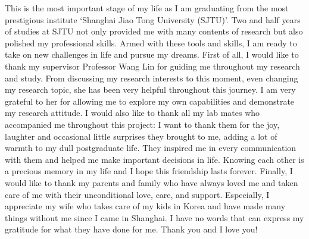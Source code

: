 \begin{thanks}
This is the most important stage of my life as I am graduating from the most prestigious
institute `Shanghai Jiao Tong University (SJTU)'. Two and half years of studies at SJTU not only provided me with many contents of research but also polished my professional skills. Armed with these tools and skills, I am ready to take on new challenges in life and pursue my dreams.
First of all, I would like to thank my supervisor Professor Wang Lin for guiding me
throughout my research and study. From discussing my research interests to this moment, even
changing my research topic, she has been very helpful throughout this journey. I am very grateful
to her for allowing me to explore my own capabilities and demonstrate my research attitude.
I would also like to thank all my lab mates who accompanied me throughout this project:
I want to thank them for the joy, laughter and occasional little surprises they brought to me,
adding a lot of warmth to my dull postgraduate life. They inspired me in every communication
with them and helped me make important decisions in life. Knowing each other is a precious
memory in my life and I hope this friendship lasts forever.
Finally, I would like to thank my parents and family who have always loved me and taken
care of me with their unconditional love, care, and support. Especially, I appreciate my wife who takes care of my kids in Korea and have made many things without me since I came in Shanghai. I have no words that can express my gratitude for what they have done for me. Thank you and I love you!
\end{thanks}
